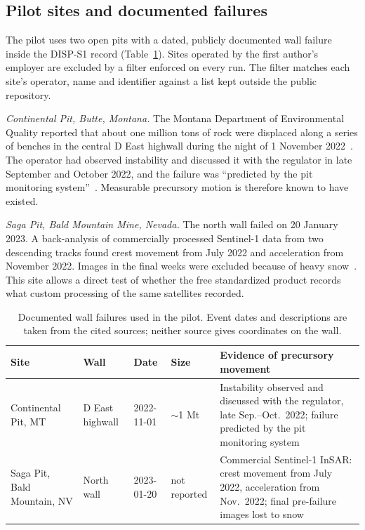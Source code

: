 \documentclass[aps,prd,twocolumn,superscriptaddress,nofootinbib,floatfix,preprintnumbers,10pt]{revtex4-2}
\begin{document}
\subsection{Pilot sites and documented failures}

The pilot uses two open pits with a dated, publicly documented wall failure inside the DISP-S1 record (Table~\ref{tab:events}). Sites operated by the first author's employer are excluded by a filter enforced on every run. The filter matches each site's operator, name and identifier against a list kept outside the public repository.

\emph{Continental Pit, Butte, Montana.} The Montana Department of Environmental Quality reported that about one million tons of rock were displaced along a series of benches in the central D East highwall during the night of 1 November 2022~\cite{MTDEQ2022}. The operator had observed instability and discussed it with the regulator in late September and October 2022, and the failure was ``predicted by the pit monitoring system''~\cite{MTDEQ2022}. Measurable precursory motion is therefore known to have existed.

\emph{Saga Pit, Bald Mountain Mine, Nevada.} The north wall failed on 20 January 2023. A back-analysis of commercially processed Sentinel-1 data from two descending tracks found crest movement from July 2022 and acceleration from November 2022. Images in the final weeks were excluded because of heavy snow~\cite{Bourgeois2024}. This site allows a direct test of whether the free standardized product records what custom processing of the same satellites recorded.

\begin{table}[t]
\caption{Documented wall failures used in the pilot. Event dates and descriptions are taken from the cited sources; neither source gives coordinates on the wall.}
\label{tab:events}
\begin{ruledtabular}
\begin{tabular}{llllp{7.2cm}}
Site & Wall & Date & Size & Evidence of precursory movement \\
\hline
Continental Pit, MT & D East highwall & 2022-11-01 & $\sim$1 Mt & Instability observed and discussed with the regulator, late Sep.--Oct.\ 2022; failure predicted by the pit monitoring system~\cite{MTDEQ2022} \\
Saga Pit, Bald Mountain, NV & North wall & 2023-01-20 & not reported & Commercial Sentinel-1 InSAR: crest movement from July 2022, acceleration from Nov.\ 2022; final pre-failure images lost to snow~\cite{Bourgeois2024} \\
\end{tabular}
\end{ruledtabular}
\end{table}
\end{document}
